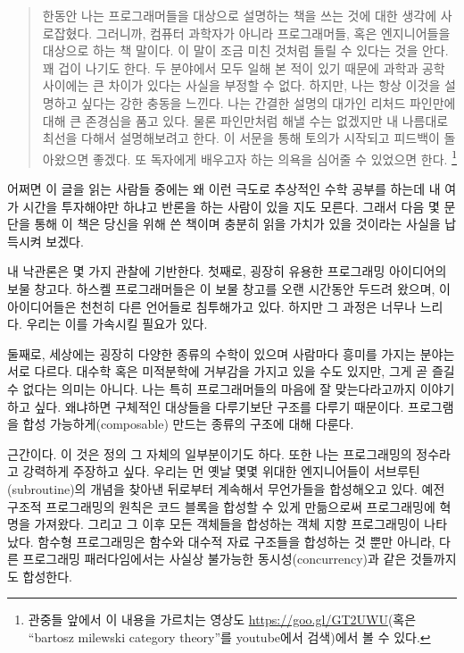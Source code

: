 
\begin{quote}
한동안 나는 프로그래머들을 대상으로 \trCategoryTheory\을 설명하는 책을 쓰는 것에 대한 생각에 사로잡혔다. 
그러니까, 컴퓨터 과학자가 아니라 프로그래머들, 혹은 엔지니어들을 대상으로 하는 책 말이다.
이 말이 조금 미친 것처럼 들릴 수 있다는 것을 안다. 꽤 겁이 나기도 한다.
두 분야에서 모두 일해 본 적이 있기 때문에 과학과 공학 사이에는 큰 차이가 있다는 사실을 부정할 수 없다.
하지만, 나는 항상 이것을 설명하고 싶다는 강한 충동을 느낀다. 나는 간결한 설명의 대가인 리처드 파인만에 대해 큰 존경심을 품고 있다.
물론 파인만처럼 해낼 수는 없겠지만 내 나름대로 최선을 다해서 설명해보려고 한다.
이 서문을 통해 토의가 시작되고 피드백이 돌아왔으면 좋겠다.
또 독자에게 \trCategoryTheory\을 배우고자 하는 의욕을 심어줄 수 있었으면 한다.
\footnote{
관중들 앞에서 이 내용을 가르치는 영상도 \href{https://goo.gl/GT2UWU}{https://goo.gl/GT2UWU}(혹은 ``bartosz milewski category theory''를 youtube에서 검색)에서 볼 수 있다.}
\end{quote}

\lettrine[lhang=0.17]{어}{쩌면} 이 글을 읽는 사람들 중에는 왜 이런 극도로 추상적인 수학 공부를 하는데 내 여가 시간을 투자해야만 하냐고 반론을 하는 사람이 있을 지도 모른다.
그래서 다음 몇 문단을 통해 이 책은 당신을 위해 쓴 책이며 충분히 읽을 가치가 있을 것이라는 사실을 납득시켜 보겠다.

내 낙관론은 몇 가지 관찰에 기반한다. 첫째로, \trCategoryTheory\는 굉장히 유용한 프로그래밍 아이디어의 보물 창고다.
하스켈 프로그래머들은 이 보물 창고를 오랜 시간동안 두드려 왔으며, 이 아이디어들은 천천히 다른 언어들로 침투해가고 있다.
하지만 그 과정은 너무나 느리다. 우리는 이를 가속시킬 필요가 있다.

둘째로, 세상에는 굉장히 다양한 종류의 수학이 있으며 사람마다 흥미를 가지는 분야는 서로 다르다.
대수학 혹은 미적분학에 거부감을 가지고 있을 수도 있지만, 그게 곧 \trCategoryTheory\를 즐길 수 없다는 의미는 아니다.
나는 \trCategoryTheory\는 특히 프로그래머들의 마음에 잘 맞는다라고까지 이야기하고 싶다. 왜냐하면 \trCategoryTheory\는 구체적인 대상들을 다루기보단 구조를 다루기 때문이다.
\trCategoryTheory\는 프로그램을 합성 가능하게(composable) 만드는 종류의 구조에 대해 다룬다.

\trComposition\은  근간이다. 이 것은  정의 그 자체의 일부분이기도 하다.
또한 나는  프로그래밍의 정수라고 강력하게 주장하고 싶다.
우리는 먼 옛날 몇몇 위대한 엔지니어들이 서브루틴(subroutine)의 개념을 찾아낸 뒤로부터 계속해서 무언가들을 합성해오고 있다.
예전 구조적 프로그래밍의 원칙은 코드 블록을 합성할 수 있게 만듦으로써 프로그래밍에 혁명을 가져왔다.
그리고 그 이후 모든 객체들을 합성하는 객체 지향 프로그래밍이 나타났다.
함수형 프로그래밍은 함수와 대수적 자료 구조들을 합성하는 것 뿐만 아니라, 다른 프로그래밍 패러다임에서는 사실상 불가능한 동시성(concurrency)과 같은 것들까지도 합성한다.

